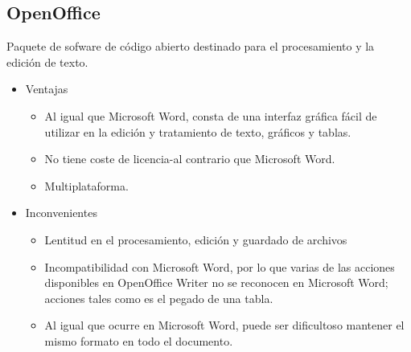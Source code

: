 \subsection{OpenOffice}
Paquete de sofware de código abierto destinado para el procesamiento y la edición de texto. 
\begin{itemize}
\item Ventajas
\begin{itemize}
\item Al igual que Microsoft Word, consta de una interfaz gráfica  fácil de utilizar en la edición y tratamiento de texto, gráficos y tablas. 
\item No tiene coste de licencia-al contrario que Microsoft Word.\nocite{apache:office}
\item Multiplataforma. 
\end{itemize}
\end{itemize}
\begin{itemize}
\item Inconvenientes
\begin{itemize}
\item Lentitud en el procesamiento, edición y guardado de archivos\nocite{theclandia:office}
\item Incompatibilidad con Microsoft Word, por lo que varias de las acciones disponibles en OpenOffice Writer no se reconocen en Microsoft Word; acciones tales como es el pegado de una tabla.
\item Al igual que ocurre en Microsoft Word, puede ser dificultoso mantener el mismo formato en todo el documento.
\end{itemize}
\end{itemize}
